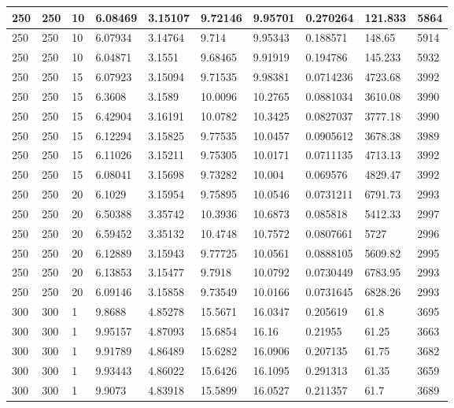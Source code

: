 \begin{landscape}
\begin{longtable}{ | l | l | l | l | l | l | l | l | l | l | }
250 & 250 & 10 & 6.08469 & 3.15107 & 9.72146 & 9.95701 & 0.270264 & 121.833 & 5864\\ \hline
250 & 250 & 10 & 6.07934 & 3.14764 & 9.714 & 9.95343 & 0.188571 & 148.65 & 5914\\ \hline
250 & 250 & 10 & 6.04871 & 3.1551 & 9.68465 & 9.91919 & 0.194786 & 145.233 & 5932\\ \hline
250 & 250 & 15 & 6.07923 & 3.15094 & 9.71535 & 9.98381 & 0.0714236 & 4723.68 & 3992\\ \hline
250 & 250 & 15 & 6.3608 & 3.1589 & 10.0096 & 10.2765 & 0.0881034 & 3610.08 & 3990\\ \hline
250 & 250 & 15 & 6.42904 & 3.16191 & 10.0782 & 10.3425 & 0.0827037 & 3777.18 & 3990\\ \hline
250 & 250 & 15 & 6.12294 & 3.15825 & 9.77535 & 10.0457 & 0.0905612 & 3678.38 & 3989\\ \hline
250 & 250 & 15 & 6.11026 & 3.15211 & 9.75305 & 10.0171 & 0.0711135 & 4713.13 & 3992\\ \hline
250 & 250 & 15 & 6.08041 & 3.15698 & 9.73282 & 10.004 & 0.069576 & 4829.47 & 3992\\ \hline
250 & 250 & 20 & 6.1029 & 3.15954 & 9.75895 & 10.0546 & 0.0731211 & 6791.73 & 2993\\ \hline
250 & 250 & 20 & 6.50388 & 3.35742 & 10.3936 & 10.6873 & 0.085818 & 5412.33 & 2997\\ \hline
250 & 250 & 20 & 6.59452 & 3.35132 & 10.4748 & 10.7572 & 0.0807661 & 5727 & 2996\\ \hline
250 & 250 & 20 & 6.12889 & 3.15943 & 9.77725 & 10.0561 & 0.0888105 & 5609.82 & 2995\\ \hline
250 & 250 & 20 & 6.13853 & 3.15477 & 9.7918 & 10.0792 & 0.0730449 & 6783.95 & 2993\\ \hline
250 & 250 & 20 & 6.09146 & 3.15858 & 9.73549 & 10.0166 & 0.0731645 & 6828.26 & 2993\\ \hline
300 & 300 & 1 & 9.8688 & 4.85278 & 15.5671 & 16.0347 & 0.205619 & 61.8 & 3695\\ \hline
300 & 300 & 1 & 9.95157 & 4.87093 & 15.6854 & 16.16 & 0.21955 & 61.25 & 3663\\ \hline
300 & 300 & 1 & 9.91789 & 4.86489 & 15.6282 & 16.0906 & 0.207135 & 61.75 & 3682\\ \hline
300 & 300 & 1 & 9.93443 & 4.86022 & 15.6426 & 16.1095 & 0.291313 & 61.35 & 3659\\ \hline
300 & 300 & 1 & 9.9073 & 4.83918 & 15.5899 & 16.0527 & 0.211357 & 61.7 & 3689\\ \hline

\end{longtable}
\end{landscape}
